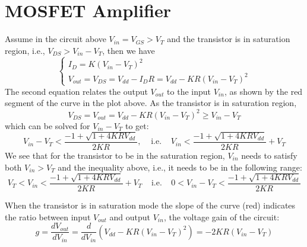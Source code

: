 \documentclass{article}
\begin{document}


\section{MOSFET Amplifier}


Assume in the circuit above $V_{in}=V_{GS}>V_T$ and the transistor is in 
saturation region, i.e., $V_{DS}>V_{in}-V_T$, then we have 
\begin{equation} 
\left\{ \begin{array}{l}
I_D=K(V_{in}-V_T)^2 \\
V_{out}=V_{DS}=V_{dd}-I_D R=V_{dd}-KR(V_{in}-V_T)^2  \end{array} \right.
\end{equation}
The second equation relates the output $V_{out}$ to the input $V_{in}$, as
shown by the red segment of the curve in the plot above. As the transistor is 
in saturation region,
\begin{equation} 
V_{DS}=V_{out}=V_{dd}-KR(V_{in}-V_T)^2\ge V_{in}-V_T 
\end{equation}
which can be solved for $V_{in}-V_T$ to get:
\begin{equation}
V_{in}-V_T <\frac{-1+\sqrt{1+4KRV_{dd}}}{2KR},\;\;\;\;\mbox{i.e.}\;\;\;\;
V_{in}<\frac{-1+\sqrt{1+4KRV_{dd}}}{2KR}+V_T 
\end{equation}
We see that for the transistor to be in the saturation region, $V_{in}$
needs to satisfy both $V_{in}>V_T$ and the inequality above, i.e., it 
needs to be in the following range:
\begin{equation}
V_T<V_{in}<\frac{-1+\sqrt{1+4KRV_{dd}}}{2KR}+V_T 
\;\;\;\;\mbox{i.e.}\;\;\;\;
0<V_{in}-V_T <\frac{-1+\sqrt{1+4KRV_{dd}}}{2KR}
\end{equation}

When the transistor is in saturation mode the slope of the curve (red) 
indicates the ratio between input $V_{out}$ and output $V_{in}$, the voltage
gain of the circuit:
\begin{equation}
g=\frac{d V_{out}}{d V_{in}}=\frac{d}{d V_{in}}(V_{dd}-KR(V_{in}-V_T)^2 )
=-2KR(V_{in}-V_T) 
\end{equation}
\end{document}
